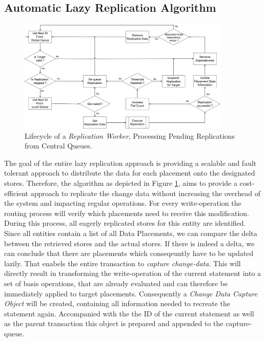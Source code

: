 
\subsection{Automatic Lazy Replication Algorithm}
\label{sec:algo}

\begin{figure}[t] 
    \centering
    \includegraphics[width=0.9\textwidth]{Figures/flow_worker.png}
    \caption{Lifecycle of a \textit{Replication Worker}, Processing Pending Replications from Central Queues.}
    \label{fig:flow_worker}
\end{figure}

The goal of the entire lazy replication approach is providing a scalable and fault tolerant approach to distribute the data for each placement onto the designated stores.
Therefore, the algorithm as depicted in Figure \ref{fig:flow_worker}, aims to provide a cost-efficient approach to replicate the change data without increasing 
the overhead of the system and impacting regular operations. 
For every write-operation the routing process will verify which placements need to receive this modification. During this process, all eagerly replicated stores for this entity
are identified. Since all entities contain a list of all Data Placements, we can compare the delta between the retrieved stores and the actual stores. 
If there is indeed a delta, we can conclude that there are placements which conseqeuntly have to be updated lazily. 
That enabels the entire transaction to \emph{capture change-data}. This will directly result in transforming the write-operation of the current statement into a set of basis 
operations, that are already evaluated and can therefore be immediately applied to target placements. Consequently a \emph{Change Data Capture Object} will be created, 
containing all information needed to recreate the statement again. Accompanied with the the ID of the current statement as well as the parent transaction this object is prepared
and appended to the capture-queue.

